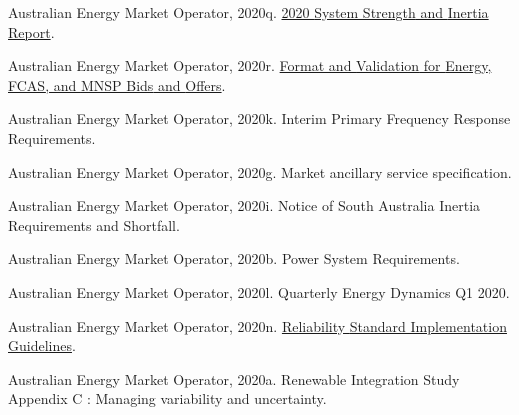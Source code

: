 \documentclass[12pt,a4paper,]{report}
\newlength{\cslhangindent}
\newenvironment{CSLReferences}[2] %
 {%
  \setlength{\parindent}{0pt}
  \ifodd #1 \everypar{\setlength{\hangindent}{\cslhangindent}}\ignorespaces\fi
  \ifnum #2 > 0
  \setlength{\parskip}{#2\baselineskip}
  \fi
 }%
 {}
\begin{document}
\begin{CSLReferences}{1}{0}
\leavevmode{}%
Australian Energy Market Operator, 2020q.
\href{https://www.aemo.com.au/-/media/files/electricity/nem/planning_and_forecasting/Operability/2020/2020-System-Strength-and-Inertia-Report\#:~:text=previously\%20declared\%20system\%20strength\%20and\%20inertia\%20shortfalls&text=The\%20inertia\%20requirements\%20include\%20the,when\%20a\%20reg}{2020
{System Strength} and {Inertia Report}}.

\leavevmode{}%
Australian Energy Market Operator, 2020r.
\href{https://www.aemo.com.au/-/media/Files/Electricity/NEM/5MS/Systems-Workstream/2019/Format-and-Validation-for-Energy-FCAS-and-MNSP-Bids-and-Offers.pdf}{Format
and {Validation} for {Energy}, {FCAS}, and {MNSP Bids} and {Offers}}.

\leavevmode{}%
Australian Energy Market Operator, 2020k. Interim {Primary Frequency
Response Requirements}.

\leavevmode{}%
Australian Energy Market Operator, 2020g. Market ancillary service
specification.

\leavevmode{}%
Australian Energy Market Operator, 2020i. Notice of {South Australia
Inertia Requirements} and {Shortfall}.

\leavevmode{}%
Australian Energy Market Operator, 2020b. Power {System Requirements}.

\leavevmode{}%
Australian Energy Market Operator, 2020l. Quarterly {Energy Dynamics Q1}
2020.

\leavevmode{}%
Australian Energy Market Operator, 2020n.
\href{https://aemo.com.au/-/media/files/electricity/nem/planning_and_forecasting/rsig/reliability-standard-implementation-guidelines.pdf?la=en}{Reliability
{Standard Implementation Guidelines}}.

\leavevmode{}%
Australian Energy Market Operator, 2020a. Renewable {Integration Study
Appendix C} : {Managing} variability and uncertainty.


\end{CSLReferences}
\end{document}
